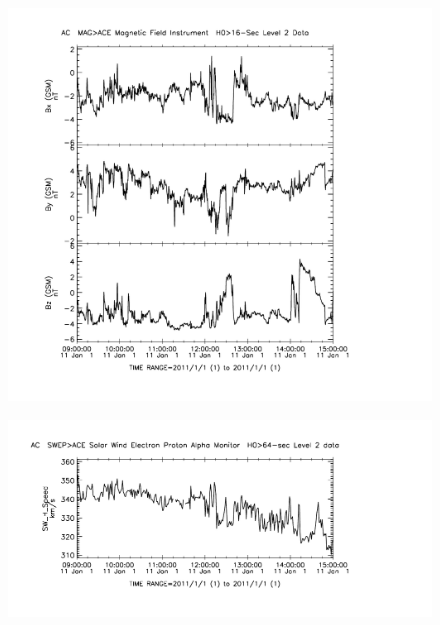 
\begin{figure}
\includegraphics[width = \textwidth]{Figures/ACE/AC_H0_MFI_19370_000.pdf}
\end{figure}


\begin{figure}
\includegraphics[width = \textwidth]{Figures/ACE/AC_H0_SWE_19370_001.pdf}
\end{figure}





